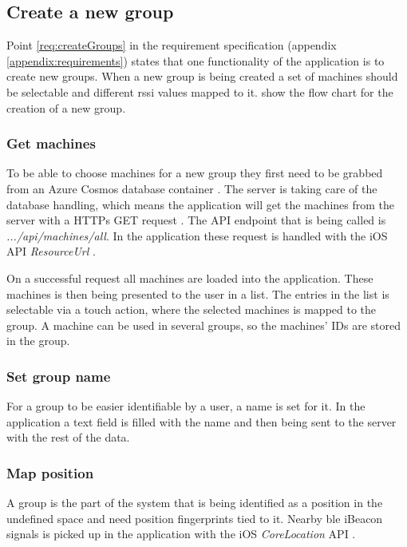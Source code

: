 \subsection{Create a new group}\label{sec:implAppNewGroup}

Point \ref{req:createGroups} in the requirement specification (appendix \ref{appendix:requirements}) states that one functionality of the application is to create new groups.
When a new group is being created a set of machines should be selectable and different \acrshort{rssi} values mapped to it.
 show the flow chart for the creation of a new group.


\subsubsection{Get machines}\label{sec:implAppNewGroupGetMachines}
To be able to choose machines for a new group they first need to be grabbed from an Azure Cosmos database container \cite{IntroductionAzureCosmos}.
The server is taking care of the database handling, which means the application will get the machines from the server with a HTTPs GET request \cite{GETHTTPMDN}.
The API endpoint that is being called is \textit{.../api/machines/all}.
In the application these request is handled with the iOS API \textit{ResourceUrl} \cite{ResourceURLAppleDeveloper}.

\bigskip

On a successful request all machines are loaded into the application.
These machines is then being presented to the user in a list.
The entries in the list is selectable via a touch action, where the selected machines is mapped to the group.
A machine can be used in several groups, so the machines' IDs are stored in the group. 

\subsubsection{Set group name}\label{sec:implAppNewGroupSetName}
For a group to be easier identifiable by a user, a name is set for it.
In the application a text field is filled with the name and then being sent to the server with the rest of the data.


\subsubsection{Map position}\label{sec:implAppNewGroupMapPos}
A group is the part of the system that is being identified as a position in the undefined space and need position fingerprints tied to it.
Nearby \acrshort{ble} iBeacon signals is picked up in the application with the iOS \textit{CoreLocation} API \cite{CoreLocationApple}.



